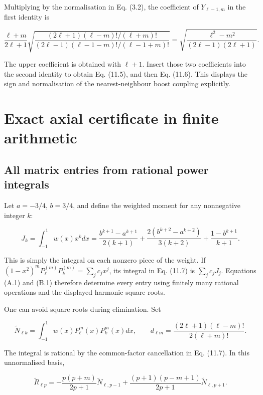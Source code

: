 \documentclass[
  11pt,
  a4paper]{article}
\begin{document}
Multiplying by the normalisation in Eq. (3.2), the coefficient of \(Y_{\ell-1,m}\) in the first identity is

\[
\frac{\ell+m}{2\ell+1}
\sqrt{\frac{(2\ell+1)(\ell-m)!/(\ell+m)!}
{(2\ell-1)(\ell-1-m)!/(\ell-1+m)!}}
=\sqrt{\frac{\ell^2-m^2}{(2\ell-1)(2\ell+1)}}.
\tag{A.7}
\]

The upper coefficient is obtained with \(\ell+1\). Insert those two coefficients into the second identity to obtain Eq. (11.5), and then Eq. (11.6). This displays the sign and normalisation of the nearest-neighbour boost coupling explicitly.

\hypertarget{appendix-b.-exact-axial-certificate-in-finite-arithmetic}{%
\section{Exact axial certificate in finite arithmetic}\label{appendix-b.-exact-axial-certificate-in-finite-arithmetic}}

\hypertarget{b.1-all-matrix-entries-from-rational-power-integrals}{%
\subsection{All matrix entries from rational power integrals}\label{b.1-all-matrix-entries-from-rational-power-integrals}}

Let \(a=-3/4\), \(b=3/4\), and define the weighted moment for any nonnegative integer \(k\):

\[
J_k=\int_{-1}^1w(x)x^kdx
=\frac{b^{k+1}-a^{k+1}}{2(k+1)}
+\frac{2(b^{k+2}-a^{k+2})}{3(k+2)}
+\frac{1-b^{k+1}}{k+1}.
\tag{B.1}
\]

This is simply the integral on each nonzero piece of the weight. If
\((1-x^2)^mP_\ell^{(m)}P_k^{(m)}=\sum_j c_jx^j\), its integral in Eq. (11.7) is \(\sum_jc_jJ_j\). Equations (A.1) and (B.1) therefore determine every entry using finitely many rational operations and the displayed harmonic square roots.

One can avoid square roots during elimination. Set

\[
\widetilde N_{\ell k}=\int_{-1}^1w(x)P_\ell^m(x)P_k^m(x)dx,
\qquad
d_{\ell m}=\frac{(2\ell+1)(\ell-m)!}{2(\ell+m)!}.
\tag{B.2}
\]

The integral is rational by the common-factor cancellation in Eq. (11.7). In this unnormalised basis,

\[
\widetilde R_{\ell p}
=-\frac{p(p+m)}{2p+1}\widetilde N_{\ell,p-1}
+\frac{(p+1)(p-m+1)}{2p+1}\widetilde N_{\ell,p+1}.
\tag{B.3}
\]
\end{document}
